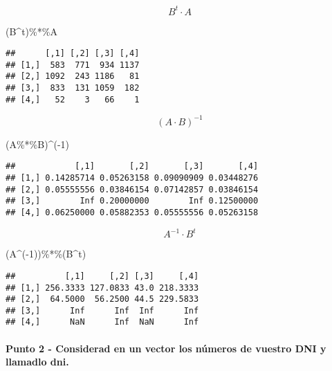 \documentclass[
]{article}
\newenvironment{Shaded}{\begin{snugshade}}{\end{snugshade}}
\newcommand{\DecValTok}[1]{\textcolor[rgb]{0.00,0.00,0.81}{#1}}
\newcommand{\NormalTok}[1]{#1}
\newcommand{\SpecialCharTok}[1]{\textcolor[rgb]{0.00,0.00,0.00}{#1}}
\begin{document}
\[B^{t} \cdot A\]

\begin{Shaded}
\begin{Highlighting}[]
\NormalTok{(B}\SpecialCharTok{\^{}}\NormalTok{t)}\SpecialCharTok{\%*\%}\NormalTok{A}
\end{Highlighting}
\end{Shaded}

\begin{verbatim}
##      [,1] [,2] [,3] [,4]
## [1,]  583  771  934 1137
## [2,] 1092  243 1186   81
## [3,]  833  131 1059  182
## [4,]   52    3   66    1
\end{verbatim}

\[(A \cdot B)^{-1}\]

\begin{Shaded}
\begin{Highlighting}[]
\NormalTok{(A}\SpecialCharTok{\%*\%}\NormalTok{B)}\SpecialCharTok{\^{}}\NormalTok{(}\SpecialCharTok{{-}}\DecValTok{1}\NormalTok{)}
\end{Highlighting}
\end{Shaded}

\begin{verbatim}
##            [,1]       [,2]       [,3]       [,4]
## [1,] 0.14285714 0.05263158 0.09090909 0.03448276
## [2,] 0.05555556 0.03846154 0.07142857 0.03846154
## [3,]        Inf 0.20000000        Inf 0.12500000
## [4,] 0.06250000 0.05882353 0.05555556 0.05263158
\end{verbatim}

\[A^{-1} \cdot B^{t}\]

\begin{Shaded}
\begin{Highlighting}[]
\NormalTok{(A}\SpecialCharTok{\^{}}\NormalTok{(}\SpecialCharTok{{-}}\DecValTok{1}\NormalTok{))}\SpecialCharTok{\%*\%}\NormalTok{(B}\SpecialCharTok{\^{}}\NormalTok{t)}
\end{Highlighting}
\end{Shaded}

\begin{verbatim}
##          [,1]     [,2] [,3]     [,4]
## [1,] 256.3333 127.0833 43.0 218.3333
## [2,]  64.5000  56.2500 44.5 229.5833
## [3,]      Inf      Inf  Inf      Inf
## [4,]      NaN      Inf  NaN      Inf
\end{verbatim}

\hypertarget{punto-2---considerad-en-un-vector-los-nuxfameros-de-vuestro-dni-y-llamadlo-dni.}{%
\paragraph{Punto 2 - Considerad en un vector los números de vuestro DNI
y llamadlo
dni.}\label{punto-2---considerad-en-un-vector-los-nuxfameros-de-vuestro-dni-y-llamadlo-dni.}}
\end{document}
